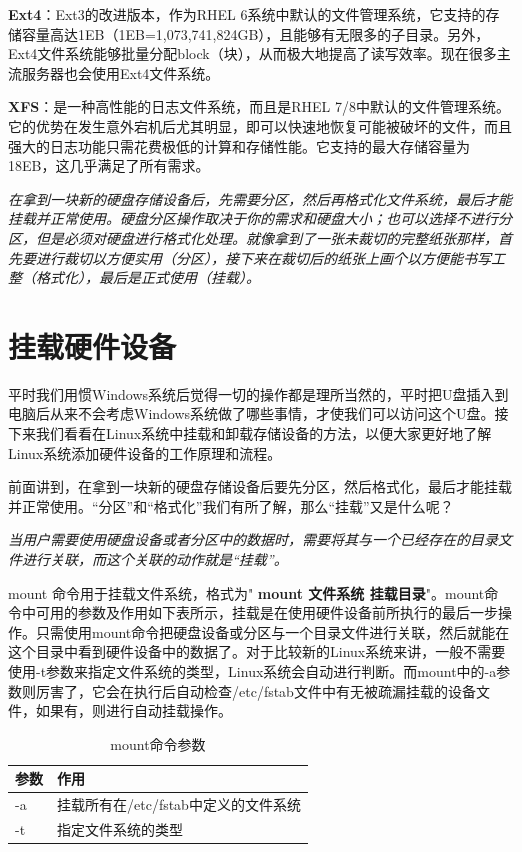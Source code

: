\documentclass[UTF8]{article}
\begin{document}
	\textbf{Ext4}：Ext3的改进版本，作为RHEL 6系统中默认的文件管理系统，它支持的存储容量高达1EB（1EB=1,073,741,824GB），且能够有无限多的子目录。另外，Ext4文件系统能够批量分配block（块），从而极大地提高了读写效率。现在很多主流服务器也会使用Ext4文件系统。
	
	\textbf{XFS}：是一种高性能的日志文件系统，而且是RHEL 7/8中默认的文件管理系统。它的优势在发生意外宕机后尤其明显，即可以快速地恢复可能被破坏的文件，而且强大的日志功能只需花费极低的计算和存储性能。它支持的最大存储容量为18EB，这几乎满足了所有需求。
	
	
	\emph{在拿到一块新的硬盘存储设备后，先需要分区，然后再格式化文件系统，最后才能挂载并正常使用。硬盘分区操作取决于你的需求和硬盘大小；也可以选择不进行分区，但是必须对硬盘进行格式化处理。就像拿到了一张未裁切的完整纸张那样，首先要进行裁切以方便实用（分区），接下来在裁切后的纸张上画个以方便能书写工整（格式化），最后是正式使用（挂载）。}
	
	
	\section{挂载硬件设备}
	
	平时我们用惯Windows系统后觉得一切的操作都是理所当然的，平时把U盘插入到电脑后从来不会考虑Windows系统做了哪些事情，才使我们可以访问这个U盘。接下来我们看看在Linux系统中挂载和卸载存储设备的方法，以便大家更好地了解Linux系统添加硬件设备的工作原理和流程。
	
	前面讲到，在拿到一块新的硬盘存储设备后要先分区，然后格式化，最后才能挂载并正常使用。“分区”和“格式化”我们有所了解，那么“挂载”又是什么呢？
	
	\emph{当用户需要使用硬盘设备或者分区中的数据时，需要将其与一个已经存在的目录文件进行关联，而这个关联的动作就是“挂载”。}
	
	mount 命令用于挂载文件系统，格式为" \textbf{mount 文件系统 挂载目录}"。mount命令中可用的参数及作用如下表所示，挂载是在使用硬件设备前所执行的最后一步操作。只需使用mount命令把硬盘设备或分区与一个目录文件进行关联，然后就能在这个目录中看到硬件设备中的数据了。对于比较新的Linux系统来讲，一般不需要使用-t参数来指定文件系统的类型，Linux系统会自动进行判断。而mount中的-a参数则厉害了，它会在执行后自动检查/etc/fstab文件中有无被疏漏挂载的设备文件，如果有，则进行自动挂载操作。
	
	\begin{table}
		\centering
		\caption{mount命令参数}
		\begin{tabular}{ll}
			\hline
			参数 & 作用 \\
			\hline
			-a & 挂载所有在/etc/fstab中定义的文件系统\\
			-t & 指定文件系统的类型 \\
			\hline
		\end{tabular}
	\end{table}
	
\end{document}
